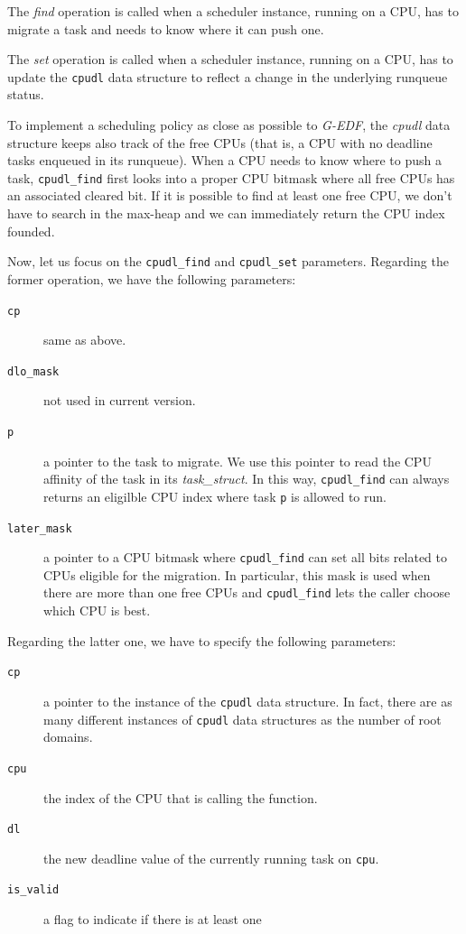 The \emph{find} operation is called when a scheduler instance, running on a CPU,
has to migrate a task and needs to know where it can push one.

The \emph{set} operation is called when a scheduler instance, running
on a CPU, has to update the \texttt{cpudl} data structure to reflect a
change in the underlying runqueue status.

To implement a scheduling policy as close as possible to \emph{G-EDF},
the \emph{cpudl} data structure keeps also track of the free CPUs
(that is, a CPU with no deadline tasks enqueued in its runqueue). When
a CPU needs to know where to push a task, \texttt{cpudl\_find} first
looks into a proper CPU bitmask where all free CPUs has an associated
cleared bit. If it is possible to find at least one free CPU, we don't
have to search in the
max-heap and we can immediately return the CPU index founded.

Now, let us focus on the \texttt{cpudl\_find} and \texttt{cpudl\_set}
parameters. Regarding the former operation, we have the following
parameters:

\begin{description}
\item[\texttt{cp}] same as above.
\item[\texttt{dlo\_mask}] not used in current version.
\item[\texttt{p}] a pointer to the task to migrate. We use this pointer
to read the CPU affinity of the task in its \emph{task\_struct}. In this
way, \texttt{cpudl\_find} can always returns an eligilble CPU index where
task \texttt{p} is allowed to run.
\item[\texttt{later\_mask}] a pointer to a CPU bitmask where 
\texttt{cpudl\_find} can set all bits related to CPUs eligible for the migration.
In particular, this mask is used when there are more than one free CPUs and
\texttt{cpudl\_find} lets the caller choose which CPU is best.
\end{description}

Regarding the latter one, we have to specify the following parameters:

\begin{description}
\item[\texttt{cp}] a pointer to the instance of the \texttt{cpudl} data
structure. In fact, there are as many different instances of \texttt{cpudl} data
structures as the number of root domains.
\item[\texttt{cpu}] the index of the CPU that is calling the function.
\item[\texttt{dl}] the new deadline value of the currently running task on
\texttt{cpu}.
\item[\texttt{is\_valid}] a flag to indicate if there is at least one
\end{description}

